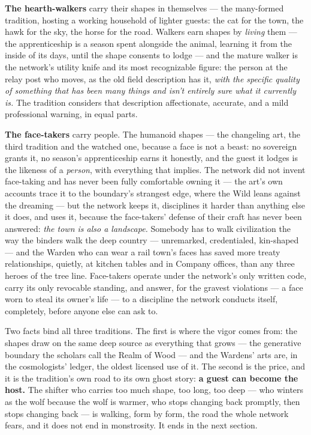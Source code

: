 \textbf{The hearth-walkers} carry their shapes in themselves --- the many-formed tradition, hosting a working household of lighter guests: the cat for the town, the hawk for the sky, the horse for the road. Walkers earn shapes by \textit{living} them --- the apprenticeship is a season spent alongside the animal, learning it from the inside of its days, until the shape consents to lodge --- and the mature walker is the network's utility knife and its most recognizable figure: the person at the relay post who moves, as the old field description has it, \textit{with the specific quality of something that has been many things and isn't entirely sure what it currently is.} The tradition considers that description affectionate, accurate, and a mild professional warning, in equal parts.

\textbf{The face-takers} carry people. The humanoid shapes --- the changeling art, the third tradition and the watched one, because a face is not a beast: no sovereign grants it, no season's apprenticeship earns it honestly, and the guest it lodges is the likeness of a \textit{person}, with everything that implies. The network did not invent face-taking and has never been fully comfortable owning it --- the art's own accounts trace it to the boundary's strangest edge, where the Wild leans against the dreaming --- but the network keeps it, disciplines it harder than anything else it does, and uses it, because the face-takers' defense of their craft has never been answered: \textit{the town is also a landscape.} Somebody has to walk civilization the way the binders walk the deep country --- unremarked, credentialed, kin-shaped --- and the Warden who can wear a rail town's faces has saved more treaty relationships, quietly, at kitchen tables and in Company offices, than any three heroes of the tree line. Face-takers operate under the network's only written code, carry its only revocable standing, and answer, for the gravest violations --- a face worn to steal its owner's life --- to a discipline the network conducts itself, completely, before anyone else can ask to.

Two facts bind all three traditions. The first is where the vigor comes from: the shapes draw on the same deep source as everything that grows --- the generative boundary the scholars call the Realm of Wood --- and the Wardens' arts are, in the cosmologists' ledger, the oldest licensed use of it. The second is the price, and it is the tradition's own road to its own ghost story: \textbf{a guest can become the host.} The shifter who carries too much shape, too long, too deep --- who winters as the wolf because the wolf is warmer, who stops changing back promptly, then stops changing back --- is walking, form by form, the road the whole network fears, and it does not end in monstrosity. It ends in the next section.

